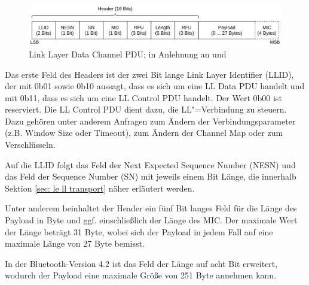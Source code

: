 \begin{figure}[H]
    \centering
    \includegraphics[width=1\textwidth]{graphics/link_layer_packetformat_pdu_data.pdf}
    \caption[Link Layer Data Channel PDU]{Link Layer Data Channel PDU; in Anlehnung an \cite{BtSpec_fig_2208a} und \cite{BtSpec_fig_2208b}}
    \label{fig: ll data channel pdu}
\end{figure}

Das erste Feld des Headers ist der zwei Bit lange Link Layer Identifier (LLID), der mit 0b01 sowie 0b10 aussagt, dass es sich um eine LL Data PDU handelt und mit 0b11, dass es sich um eine LL Control PDU handelt. Der Wert 0b00 ist reserviert. Die LL Control PDU dient dazu, die LL"=Verbindung zu steuern. Dazu gehören unter anderem Anfragen zum Ändern der Verbindungsparameter (z.B. Window Size oder Timeout), zum Ändern der Channel Map oder zum Verschlüsseln.

Auf die LLID folgt das Feld der Next Expected Sequence Number (NESN) und das Feld der Sequence Number (SN) mit jeweils einem Bit Länge, die innerhalb Sektion \ref{sec: le ll transport} näher erläutert werden.

Unter anderem beinhaltet der Header ein fünf Bit langes Feld für die Länge des Payload in Byte und ggf. einschließlich der Länge des MIC. Der maximale Wert der Länge beträgt 31 Byte, wobei sich der Payload in jedem Fall auf eine maximale Länge von 27 Byte bemisst. \cite{BtSpec4.0_2208-2209}

In der Bluetooth-Version 4.2 ist das Feld der Länge auf acht Bit erweitert, wodurch der Payload eine maximale Größe von 251 Byte annehmen kann. \cite{BtSpec4.2_2589-2590}